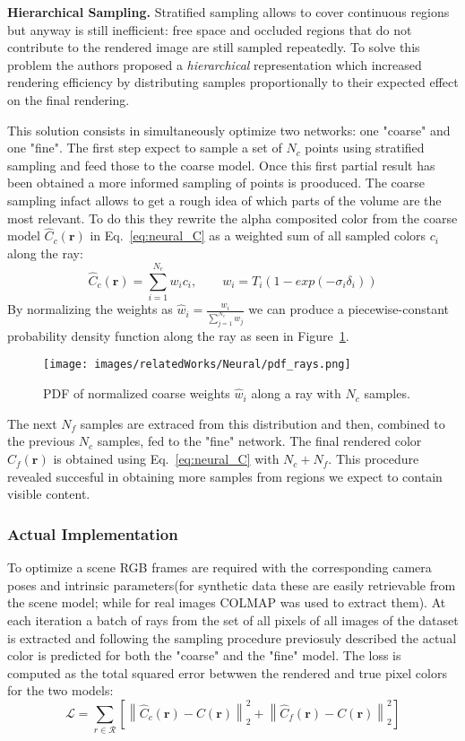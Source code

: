 \textbf{Hierarchical Sampling.} Stratified sampling allows to cover continuous
regions but anyway is still inefficient: free space and occluded regions that do not 
contribute to the rendered image are still sampled repeatedly. To solve this 
problem the authors proposed a \textit{hierarchical} representation which increased
rendering efficiency by distributing samples proportionally to their expected 
effect on the final rendering.

This solution consists in simultaneously optimize two networks: one "coarse" and
one "fine". The first step expect to sample a set of $N_c$ points using stratified 
sampling and feed those to the coarse model. Once this first partial result has 
been obtained a more informed sampling of points is prooduced. The coarse sampling 
infact allows to get a rough idea of which parts of the volume are the most relevant.
To do this they rewrite the alpha composited color from the coarse model $\hat{C}_c(\textbf{r})$
in Eq.~\ref{eq:neural_C} as a weighted sum of all sampled colors $c_i$ along the ray:
\begin{equation}
    \hat{C}_c(\textbf{r}) = \sum_{i=1}^{N_c} w_i c_i, \quad \quad w_i = T_i(1-exp(-\sigma_i \delta_i))
\end{equation}
By normalizing the weights as $\hat{w}_i = \frac{w_i}{\sum_{j=1}^{N_c}w_j}$ we can produce
a piecewise-constant probability density function along the ray as seen in Figure~\ref{fig:pdf_ray}.
\begin{figure}
    \centering
    \texttt{[image: images/relatedWorks/Neural/pdf\_rays.png]} 
    \caption{PDF of normalized coarse weights $\hat{w}_i$ along a ray with $N_c$ samples.}\label{fig:pdf_ray}
\end{figure}
The next $N_f$ samples are extraced from this distribution and then, combined to the previous $N_c$ samples,
fed to the "fine" network. The final rendered color $\hat{C}_f(\textbf{r})$ is obtained using
Eq.~\ref{eq:neural_C} with $N_c+N_f$. This procedure revealed succesful in obtaining more
samples from regions we expect to contain visible content.

\subsubsection{Actual Implementation}
To optimize a scene RGB frames are required with the corresponding camera poses and intrinsic
parameters(for synthetic data these are easily retrievable from the scene model; while for
real images COLMAP was used to extract them).
At each iteration a batch of rays from the set of all pixels of all images of the dataset
is extracted and following the sampling procedure previosuly described the actual color 
is predicted for both the "coarse" and the "fine" model. The loss is computed as the 
total squared error betwwen the rendered and true pixel colors for the two models:
\begin{equation}
    \mathcal{L} = \sum_{r\in\mathcal{R} }[\left\lVert {\hat{C}_c(\textbf{r})-C(\textbf{r})} \right\rVert_2^2+\left\lVert {\hat{C}_f(\textbf{r})-C(\textbf{r})} \right\rVert_2^2]
\end{equation}

